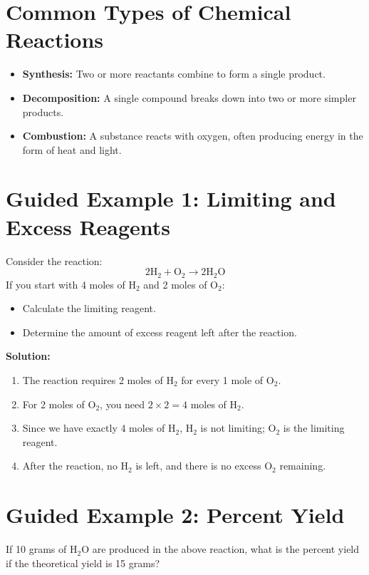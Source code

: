 \documentclass[12pt]{article}
\begin{document}
\section*{Common Types of Chemical Reactions}
\begin{itemize}
    \item \textbf{Synthesis:} Two or more reactants combine to form a single product.
    \item \textbf{Decomposition:} A single compound breaks down into two or more simpler products.
    \item \textbf{Combustion:} A substance reacts with oxygen, often producing energy in the form of heat and light.
\end{itemize}

\section*{Guided Example 1: Limiting and Excess Reagents}
Consider the reaction:
\[
2 \text{H}_2 + \text{O}_2 \rightarrow 2 \text{H}_2\text{O}
\]
If you start with 4 moles of \(\text{H}_2\) and 2 moles of \(\text{O}_2\):
\begin{itemize}
    \item Calculate the limiting reagent.
    \item Determine the amount of excess reagent left after the reaction.
\end{itemize}

\textbf{Solution:}
\begin{enumerate}
    \item The reaction requires 2 moles of \(\text{H}_2\) for every 1 mole of \(\text{O}_2\).
    \item For 2 moles of \(\text{O}_2\), you need \(2 \times 2 = 4\) moles of \(\text{H}_2\).
    \item Since we have exactly 4 moles of \(\text{H}_2\), \(\text{H}_2\) is not limiting; \(\text{O}_2\) is the limiting reagent.
    \item After the reaction, no \(\text{H}_2\) is left, and there is no excess \(\text{O}_2\) remaining.
\end{enumerate}

\section*{Guided Example 2: Percent Yield}
If 10 grams of \(\text{H}_2\text{O}\) are produced in the above reaction, what is the percent yield if the theoretical yield is 15 grams?
\end{document}
